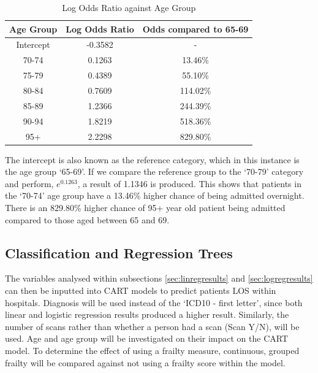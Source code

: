 \documentclass[../thesis.tex]{subfiles}
\begin{document}
\begin{table}[h!]
    \centering
    \begin{tabular}{ccc}\toprule
    \textbf{Age Group} & \textbf{Log Odds Ratio} &\textbf{Odds compared to 65-69} \\ \midrule
       Intercept  & -0.3582 & -\\
       70-74 & 0.1263 & 13.46\%\\
       75-79 & 0.4389 & 55.10\%\\
       80-84 & 0.7609 &114.02\%\\
       85-89 & 1.2366 & 244.39\%\\
       90-94 & 1.8219& 518.36\%\\
       95+ & 2.2298& 829.80\%\\ \bottomrule
    \end{tabular}
    \caption{Log Odds Ratio against Age Group}
    \label{tab:logisticregcat}
\end{table}
The intercept is also known as the reference category, which in this instance is the age group `65-69'. If we compare the reference group to the `70-79' category and perform, $e^{0.1263}$, a result of 1.1346 is produced. This shows that patients in the `70-74' age group have a 13.46\% higher chance of being admitted overnight. There is an 829.80\% higher chance of 95+ year old patient being admitted compared to those aged between 65 and 69.





\subsection{Classification and Regression Trees}
The variables analysed within subsections \ref{sec:linregresults} and \ref{sec:logregresults} can then be inputted into CART models to predict patients LOS within hospitals. Diagnosis will be used instead of the `ICD10 - first letter', since both linear and logistic regression results produced a higher result. Similarly, the number of scans rather than whether a person had a scan (Scan Y/N), will be used. Age and age group will be investigated on their impact on the CART model. To determine the effect of using a frailty measure, continuous, grouped frailty will be compared against not using a frailty score within the model.
\end{document}

